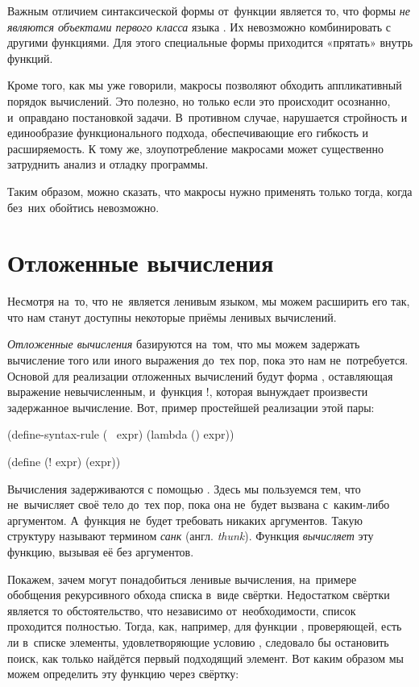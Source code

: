 Важным отличием синтаксической формы от~функции является то, что формы \emph{не являются объектами первого класса} языка \Scheme. Их невозможно комбинировать с  другими функциями. Для этого специальные формы приходится «прятать» внутрь функций.

Кроме того, как мы уже говорили, макросы позволяют обходить аппликативный порядок вычислений. Это полезно, но только если это происходит осознанно, и~оправдано постановкой задачи. В~противном случае, нарушается стройность и единообразие функционального подхода, обеспечивающие его гибкость и расширяемость. К тому же, злоупотребление макросами может существенно затруднить анализ и отладку программы.

Таким образом, можно сказать, что макросы нужно применять только тогда, когда без~них обойтись невозможно.

\section{Отложенные вычисления}%
\label{delay}Несмотря на~то, что \Scheme не~является ленивым языком, мы можем расширить его так, что нам станут доступны некоторые приёмы ленивых вычислений.

\emph{Отложенные вычисления} базируются на~том, что мы можем задержать вычисление того или иного выражения до~тех пор, пока это нам не~потребуется. Основой для реализации отложенных вычислений будут форма , оставляющая выражение  невычисленным, и~функция \si{!}, которая вынуждает произвести задержанное вычисление.
\label{lazy}Вот, пример простейшей реализации этой пары:

\begin{Definition}
(define-syntax-rule (~ expr)
  (lambda () expr))

(define (! expr) (expr))
\end{Definition}

Вычисления задерживаются с помощью . Здесь мы пользуемся тем, что  не~вычисляет своё тело до~тех пор, пока она не~будет вызвана с~каким-либо аргументом. А~функция  не~будет требовать никаких аргументов. Такую структуру называют термином \emph{санк} (англ. \emph{thunk}). Функция \s{!} \emph{вычисляет} эту функцию, вызывая её без аргументов.

Покажем, зачем могут понадобиться ленивые вычисления, на~примере обобщения рекурсивного обхода списка в~виде свёртки. Недостатком свёртки является то обстоятельство, что независимо от~необходимости, список проходится полностью. Тогда, как, например, для функции , проверяющей, есть ли в~списке  элементы, удовлетворяющие условию , следовало бы остановить поиск, как только найдётся первый подходящий элемент. Вот каким образом мы можем определить эту функцию через свёртку:

